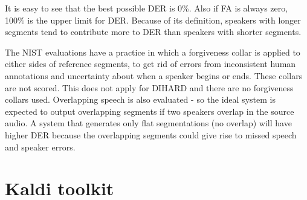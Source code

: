		It is easy to see that the best possible DER is 0\%. Also if FA is always zero, 100\% is the upper limit for DER. Because of its definition, speakers with longer segments tend to contribute more to DER than speakers with shorter segments.
		
		The NIST evaluations have a practice in which a forgiveness collar is applied to either sides of reference segments, to get rid of errors from inconsistent human annotations and uncertainty about when a speaker begins or ends. These collars are not scored. This does not apply for DIHARD and there are no forgiveness collars used. Overlapping speech is also evaluated - so the ideal system is expected to output overlapping segments if two speakers overlap in the source audio. A system that generates only flat segmentations (no overlap) will have higher DER because the overlapping segments could give rise to missed speech and speaker errors.

\section{Kaldi toolkit}
